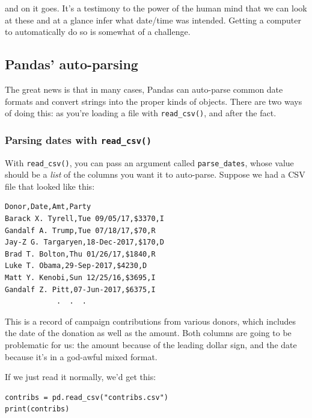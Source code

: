 and on it goes. It's a testimony to the power of the human mind that we can
look at these and at a glance infer what date/time was intended. Getting a
computer to automatically do so is somewhat of a challenge.


\subsection{Pandas' auto-parsing}

The great news is that in many cases, Pandas can auto-parse common date formats
and convert strings into the proper kinds of objects. There are two ways of
doing this: as you're loading a file with \texttt{read\_csv()}, and after the
fact.

\subsubsection{Parsing dates with \texttt{read\_csv()}}


With \texttt{read\_csv()}, you can pass an argument called
\texttt{parse\_dates}, whose value should be a \textit{list} of the columns you
want it to auto-parse. Suppose we had a CSV file that looked like this:

\begin{Verbatim}[fontsize=\small,samepage=true,frame=lines,framesep=3mm]
Donor,Date,Amt,Party
Barack X. Tyrell,Tue 09/05/17,$3370,I
Gandalf A. Trump,Tue 07/18/17,$70,R
Jay-Z G. Targaryen,18-Dec-2017,$170,D
Brad T. Bolton,Thu 01/26/17,$1840,R
Luke T. Obama,29-Sep-2017,$4230,D
Matt Y. Kenobi,Sun 12/25/16,$3695,I
Gandalf Z. Pitt,07-Jun-2017,$6375,I
            .  .  .
\end{Verbatim}

This is a record of campaign contributions from various donors, which includes
the date of the donation as well as the amount. Both columns are going to be
problematic for us: the amount because of the leading dollar sign, and the date
because it's in a god-awful mixed format.

If we just read it normally, we'd get this:

\begin{Verbatim}[fontsize=\small,samepage=true,frame=single,framesep=3mm]
contribs = pd.read_csv("contribs.csv")
print(contribs)
\end{Verbatim}
\vspace{-.2in}

